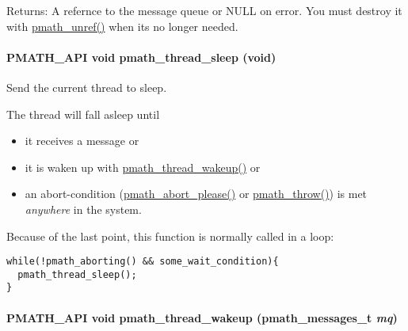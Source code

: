 \begin{Desc}
\item[Returns:]A refernce to the message queue or NULL on error. You must destroy it with \hyperlink{classpmath__t_54e905402c38940687033b87eb8c6c9f}{pmath\_\-unref()} when its no longer needed. \end{Desc}
\hypertarget{group__threadmsg_gce6da6e34b0aeab35094ddccdd9a3e55}{
\paragraph[{pmath\_\-thread\_\-sleep}]{\setlength{\rightskip}{0pt plus 5cm}PMATH\_\-API void pmath\_\-thread\_\-sleep (void)}\hfill}
\label{group__threadmsg_gce6da6e34b0aeab35094ddccdd9a3e55}


Send the current thread to sleep. 

The thread will fall asleep until\begin{itemize}
\item it receives a message or\item it is waken up with \hyperlink{group__threadmsg_gbf90d49f5c42ccaa736ae5e56af6a4a6}{pmath\_\-thread\_\-wakeup()} or\item an abort-condition (\hyperlink{group__threads_g84e45036b76764def6390af12d2070bf}{pmath\_\-abort\_\-please()} or \hyperlink{group__threads_gf1aa6d6603faaa4120207be6108e356c}{pmath\_\-throw()}) is met {\em anywhere\/} in the system.\end{itemize}


Because of the last point, this function is normally called in a loop: 

\begin{Code}\begin{verbatim}while(!pmath_aborting() && some_wait_condition){
  pmath_thread_sleep();
}
\end{verbatim}
\end{Code}

 \hypertarget{group__threadmsg_gbf90d49f5c42ccaa736ae5e56af6a4a6}{
\paragraph[{pmath\_\-thread\_\-wakeup}]{\setlength{\rightskip}{0pt plus 5cm}PMATH\_\-API void pmath\_\-thread\_\-wakeup ({\bf pmath\_\-messages\_\-t} {\em mq})}\hfill}
\label{group__threadmsg_gbf90d49f5c42ccaa736ae5e56af6a4a6}


